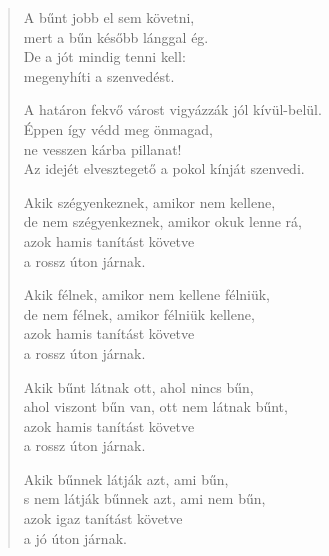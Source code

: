 \begin{verse}
 A bűnt jobb el sem követni,\\
mert a bűn később lánggal ég.\\
De a jót mindig tenni kell:\\
megenyhíti a szenvedést.

 A határon fekvő várost vigyázzák jól kívül-belül.\\
Éppen így védd meg önmagad,\\
ne vesszen kárba pillanat!\\
Az idejét elvesztegető a pokol kínját szenvedi.

 Akik szégyenkeznek, amikor nem kellene,\\
de nem szégyenkeznek, amikor okuk lenne rá,\\
azok hamis tanítást követve\\
a rossz úton járnak.

 Akik félnek, amikor nem kellene félniük,\\
de nem félnek, amikor félniük kellene,\\
azok hamis tanítást követve\\
a rossz úton járnak.

 Akik bűnt látnak ott, ahol nincs bűn,\\
ahol viszont bűn van, ott nem látnak bűnt,\\
azok hamis tanítást követve\\
a rossz úton járnak.

 Akik bűnnek látják azt, ami bűn,\\
s nem látják bűnnek azt, ami nem bűn,\\
azok igaz tanítást követve\\
a jó úton járnak.

\end{verse}
